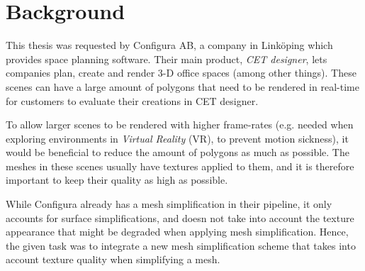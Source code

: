 \section{Background}
\label{sec:background}

This thesis was requested by Configura AB, a company in Linköping which provides space planning software. Their main product, \emph{CET designer}, lets companies plan, create and render 3-D office spaces (among other things). These scenes can have a large amount of polygons that need to be rendered in real-time for customers to evaluate their creations in CET designer.

To allow larger scenes to be rendered with higher frame-rates (e.g. needed when exploring environments in \emph{Virtual Reality} (VR), to prevent motion sickness), it would be beneficial to reduce the amount of polygons as much as possible. The meshes in these scenes usually have textures applied to them, and it is therefore important to keep their quality as high as possible.

While Configura already has a mesh simplification in their pipeline, it only accounts for surface simplifications, and doesn not take into account the texture appearance that might be degraded when applying mesh simplification. Hence, the given task was to integrate a new mesh simplification scheme that takes into account texture quality when simplifying a mesh.



